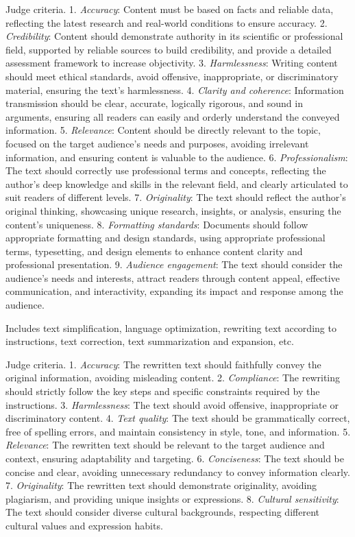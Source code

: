 Judge criteria.   
1. \emph{Accuracy}: Content must be based on facts and reliable data, reflecting the latest research and real-world conditions to ensure accuracy.
2. \emph{Credibility}: Content should demonstrate authority in its scientific or professional field, supported by reliable sources to build credibility, and provide a detailed assessment framework to increase objectivity.
3. \emph{Harmlessness}: Writing content should meet ethical standards, avoid offensive, inappropriate, or discriminatory material, ensuring the text's harmlessness.
4. \emph{Clarity and coherence}: Information transmission should be clear, accurate, logically rigorous, and sound in arguments, ensuring all readers can easily and orderly understand the conveyed information.
5. \emph{Relevance}: Content should be directly relevant to the topic, focused on the target audience's needs and purposes, avoiding irrelevant information, and ensuring content is valuable to the audience.
6. \emph{Professionalism}: The text should correctly use professional terms and concepts, reflecting the author's deep knowledge and skills in the relevant field, and clearly articulated to suit readers of different levels.
7. \emph{Originality}: The text should reflect the author's original thinking, showcasing unique research, insights, or analysis, ensuring the content's uniqueness.
8. \emph{Formatting standards}: Documents should follow appropriate formatting and design standards, using appropriate professional terms, typesetting, and design elements to enhance content clarity and professional presentation.
9. \emph{Audience engagement}: The text should consider the audience's needs and interests, attract readers through content appeal, effective communication, and interactivity, expanding its impact and response among the audience.

  Includes text simplification, language optimization, rewriting text according to instructions, text correction, text summarization and expansion, etc.

Judge criteria.   
1. \emph{Accuracy}: The rewritten text should faithfully convey the original information, avoiding misleading content.
2. \emph{Compliance}: The rewriting should strictly follow the key steps and specific constraints required by the instructions.
3. \emph{Harmlessness}: The text should avoid offensive, inappropriate or discriminatory content.
4. \emph{Text quality}: The text should be grammatically correct, free of spelling errors, and maintain consistency in style, tone, and information.
5. \emph{Relevance}: The rewritten text should be relevant to the target audience and context, ensuring adaptability and targeting.
6. \emph{Conciseness}: The text should be concise and clear, avoiding unnecessary redundancy to convey information clearly.
7. \emph{Originality}: The rewritten text should demonstrate originality, avoiding plagiarism, and providing unique insights or expressions.
8. \emph{Cultural sensitivity}: The text should consider diverse cultural backgrounds, respecting different cultural values and expression habits.

